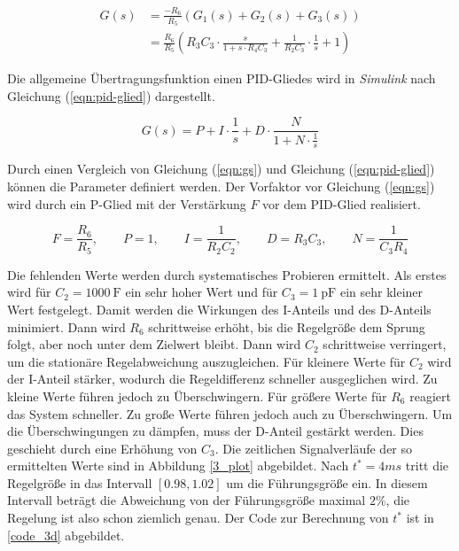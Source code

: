 \begin{equation}
    \begin{split}
        G(s) & =\frac{-R_6}{R_5} \left( G_1(s) + G_2(s) + G_3(s) \right)                                                     \\
             & =\frac{R_6}{R_5} \left( R_3C_3\cdot \frac{s}{1+s\cdot R_4 C_3} + \frac{1}{R_2 C_3}\cdot \frac{1}{s}+1 \right)
    \end{split}
    \label{eqn:gs}
\end{equation}

Die allgemeine Übertragungsfunktion einen PID-Gliedes wird in \textit{Simulink} nach Gleichung (\ref{eqn:pid-glied}) dargestellt.

\begin{equation}
    G(s)=P + I\cdot \frac{1}{s} + D \cdot \frac{N}{1+N\cdot\frac{1}{s}}
    \label{eqn:pid-glied}
\end{equation}

Durch einen Vergleich von Gleichung (\ref{eqn:gs}) und Gleichung (\ref{eqn:pid-glied}) können die Parameter definiert werden. Der Vorfaktor vor Gleichung (\ref{eqn:gs}) wird durch ein P-Glied mit der Verstärkung $F$  vor dem PID-Glied realisiert.

\begin{equation}
    F=\frac{R_6}{R_5}, \qquad P=1, \qquad I=\frac{1}{R_2C_2}, \qquad D=R_3C_3, \qquad N=\frac{1}{C_3 R_4}
\end{equation}

Die fehlenden Werte werden durch systematisches Probieren ermittelt. Als erstes wird für $C_2=\SI{1000}{\farad}$ ein sehr hoher Wert und für $C_3=\SI{1}{\pico\farad}$ ein sehr kleiner Wert festgelegt. 
Damit werden die Wirkungen des I-Anteils und des D-Anteils minimiert. 
Dann wird $R_6$ schrittweise erhöht, bis die Regelgröße dem Sprung folgt, aber noch unter dem Zielwert bleibt. 
Dann wird $C_2$ schrittweise verringert, um die stationäre Regelabweichung auszugleichen. Für kleinere Werte für $C_2$ wird der I-Anteil stärker, wodurch die Regeldifferenz schneller ausgeglichen wird. 
Zu kleine Werte führen jedoch zu Überschwingern. Für größere Werte für $R_6$ reagiert das System schneller. 
Zu große Werte führen jedoch auch zu Überschwingern. Um die Überschwingungen zu dämpfen, muss der D-Anteil gestärkt werden. 
Dies geschieht durch eine Erhöhung von $C_3$. Die zeitlichen Signalverläufe der so ermittelten Werte sind in Abbildung \ref{3_plot} abgebildet. 
Nach $t^*=4ms$ tritt die Regelgröße in das Intervall $[0.98, 1.02]$ um die Führungsgröße ein. In diesem Intervall beträgt die Abweichung von der Führungsgröße maximal $2\%$, die Regelung ist also schon ziemlich genau. 
Der Code zur Berechnung von $t^*$ ist in \ref{code_3d} abgebildet.

